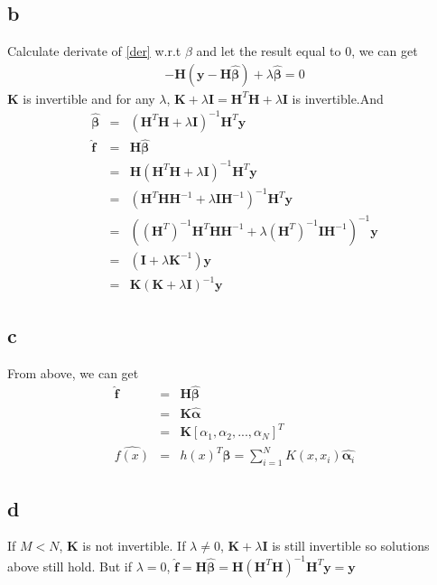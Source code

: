 \documentclass[11pt, oneside]{article}   	%
\begin{document}
\subsection{b}
Calculate derivate of \ref{der} w.r.t $\beta$ and let the result equal to 0, we can get 
\begin{eqnarray}
-\mathbf{H} (\mathbf{y} -\mathbf{H} \hat{\mathbf{\beta}} ) + \lambda \hat{\mathbf{\beta}} = 0
\end{eqnarray}
$\mathbf{K}$ is invertible and for any $\lambda$, $\mathbf{K} + \lambda \mathbf{I} = \mathbf{H}^T \mathbf{H} + \lambda \mathbf{I}$ is invertible.And
\begin{eqnarray}
\hat{\mathbf{\beta}} &=& (\mathbf{H}^T \mathbf{H} + \lambda \mathbf{I})^{-1} \mathbf{H}^T \mathbf{y}\\
\hat{\mathbf{f}} &=&  \mathbf{H}\hat{\mathbf{\beta}}\\
&=& \mathbf{H} (\mathbf{H}^T \mathbf{H} + \lambda \mathbf{I})^{-1} \mathbf{H}^T \mathbf{y}\\
&=& (\mathbf{H}^T \mathbf{H}\mathbf{H}^{-1} + \lambda \mathbf{I}\mathbf{H}^{-1})^{-1} \mathbf{H}^T \mathbf{y}\\
&=& ( (\mathbf{H}^T)^{-1} \mathbf{H}^T \mathbf{H}\mathbf{H}^{-1} + \lambda (\mathbf{H}^T)^{-1} \mathbf{I}\mathbf{H}^{-1})^{-1} \mathbf{y}\\
&=& (\mathbf{I} +  \lambda \mathbf{K}^{-1} ) \mathbf{y} \\
&=& \mathbf{K} ( \mathbf{K} + \lambda \mathbf{I} )^{-1} \mathbf{y}
\end{eqnarray}

\subsection{c}
From above, we can get
\begin{eqnarray}
\hat{\mathbf{f}} &=&  \mathbf{H}\hat{\mathbf{\beta}}\\
&=& \mathbf{K} \hat{\mathbf{\alpha}}\\
&=&  \mathbf{K} [\alpha_1, \alpha_2, ..., \alpha_N]^T \\
\hat{f(x)} &=& h(x)^T \hat{\mathbf{\beta}} = \sum_{i=1}^N K(x, x_i) \hat{\mathbf{\alpha}_i}
\end{eqnarray}

\subsection{d}
If $M < N$, $\mathbf{K}$ is not invertible. If $\lambda \ne 0$, $\mathbf{K} + \lambda \mathbf{I}$ is still invertible so solutions above still hold. But if $\lambda = 0$, $\hat{\mathbf{f}} =  \mathbf{H}\hat{\mathbf{\beta}} = \mathbf{H} (\mathbf{H}^T \mathbf{H})^{-1} \mathbf{H}^T \mathbf{y} = \mathbf{y} $
\end{document}
